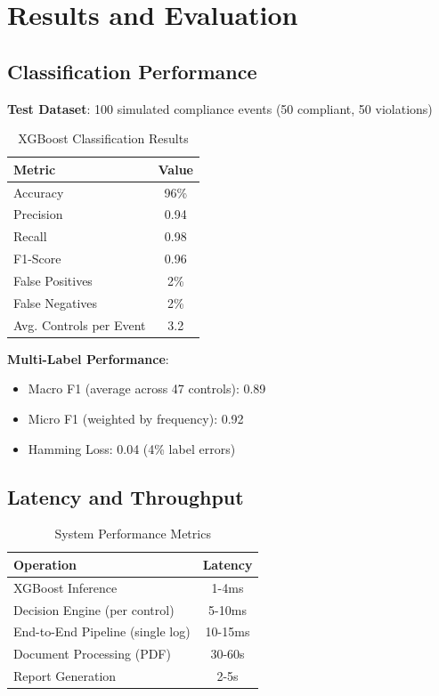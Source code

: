 \documentclass[11pt,conference]{IEEEtran}
\begin{document}
\section{Results and Evaluation}

\subsection{Classification Performance}

\textbf{Test Dataset}: 100 simulated compliance events (50 compliant, 50 violations)

\begin{table}[h]
\centering
\caption{XGBoost Classification Results}
\begin{tabular}{lc}
\toprule
\textbf{Metric} & \textbf{Value} \\
\midrule
Accuracy & 96\% \\
Precision & 0.94 \\
Recall & 0.98 \\
F1-Score & 0.96 \\
False Positives & 2\% \\
False Negatives & 2\% \\
Avg. Controls per Event & 3.2 \\
\bottomrule
\end{tabular}
\end{table}

\textbf{Multi-Label Performance}:
\begin{itemize}
    \item Macro F1 (average across 47 controls): 0.89
    \item Micro F1 (weighted by frequency): 0.92
    \item Hamming Loss: 0.04 (4\% label errors)
\end{itemize}

\subsection{Latency and Throughput}

\begin{table}[h]
\centering
\caption{System Performance Metrics}
\begin{tabular}{lc}
\toprule
\textbf{Operation} & \textbf{Latency} \\
\midrule
XGBoost Inference & 1-4ms \\
Decision Engine (per control) & 5-10ms \\
End-to-End Pipeline (single log) & 10-15ms \\
Document Processing (PDF) & 30-60s \\
Report Generation & 2-5s \\
\bottomrule
\end{tabular}
\end{table}
\end{document}
